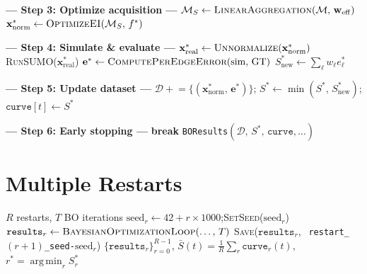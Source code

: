 \documentclass[11pt]{article}
\begin{document}
\begin{algorithm}[H]
\begin{algorithmic}[1]
    \vspace{4pt}
    \State \textbf{--- Step 3: Optimize acquisition ---}
    \State $\mathcal{M}_S \gets \textsc{LinearAggregation}(\mathcal{M},\,\mathbf{w}_{\mathrm{eff}})$
    \State $\mathbf{x}^*_{\mathrm{norm}} \gets \textsc{OptimizeEI}(\mathcal{M}_S,\, f^*)$

    \vspace{4pt}
    \State \textbf{--- Step 4: Simulate \& evaluate ---}
    \State $\mathbf{x}^*_{\mathrm{real}} \gets \textsc{Unnormalize}(\mathbf{x}^*_{\mathrm{norm}})$
    \State \textsc{RunSUMO}($\mathbf{x}^*_{\mathrm{real}}$)
    \State $\mathbf{e}^* \gets \textsc{ComputePerEdgeError}(\text{sim},\, \text{GT})$
    \State $S^*_{\mathrm{new}} \gets \sum_\ell w_\ell e^*_\ell$

    \vspace{4pt}
    \State \textbf{--- Step 5: Update dataset ---}
    \State $\mathcal{D} \mathrel{+}= \{(\mathbf{x}^*_{\mathrm{norm}},\, \mathbf{e}^*)\}$;\quad
           $S^* \gets \min(S^*,\, S^*_{\mathrm{new}})$;\quad
           $\texttt{curve}[t] \gets S^*$

    \vspace{4pt}
    \State \textbf{--- Step 6: Early stopping ---}
        \State \textbf{break}
    \EndIf
\EndFor
\State \Return \texttt{BOResults}$(\mathcal{D},\, S^*,\, \texttt{curve}, \dots)$
\end{algorithmic}
\end{algorithm}

\section{Multiple Restarts}

\begin{algorithm}[H]
\caption{\textsc{RunMultipleRestarts}}
\begin{algorithmic}[1]
\Require $R$ restarts, $T$ BO iterations
    \State $\text{seed}_r \gets 42 + r \times 1000$;\quad \textsc{SetSeed}($\text{seed}_r$)
    \State $\texttt{results}_r \gets \textsc{BayesianOptimizationLoop}(\dots,\, T)$
    \State \textsc{Save}($\texttt{results}_r,\;$
           \texttt{restart\_}$(r{+}1)$\texttt{\_seed-}$\text{seed}_r$)
\EndFor
\State \Return $\bigl\{\texttt{results}_r\bigr\}_{r=0}^{R-1}$,\quad
       $\bar{S}(t) = \tfrac{1}{R}\sum_r \texttt{curve}_r(t)$,\quad
       $r^* = \operatorname{arg\,min}_r S^*_r$
\end{algorithmic}
\end{algorithm}
\end{document}
